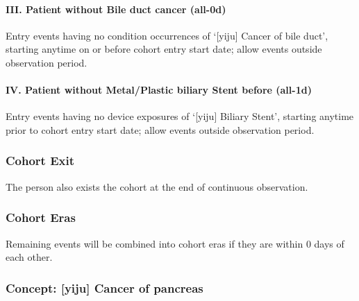 \documentclass[
  12pt,
]{article}
\begin{document}
\paragraph*{III. Patient without Bile duct cancer (all-0d)}\label{iii.-patient-without-bile-duct-cancer-all-0d}

Entry events having no condition occurrences of `{[}yiju{]} Cancer of bile duct', starting anytime on or before cohort entry start date; allow events outside observation period.

\paragraph*{IV. Patient without Metal/Plastic biliary Stent before (all-1d)}\label{iv.-patient-without-metalplastic-biliary-stent-before-all-1d}

Entry events having no device exposures of `{[}yiju{]} Biliary Stent', starting anytime prior to cohort entry start date; allow events outside observation period.

\subsubsection{Cohort Exit}\label{cohort-exit}

The person also exists the cohort at the end of continuous observation.

\subsubsection{Cohort Eras}\label{cohort-eras}

Remaining events will be combined into cohort eras if they are within 0 days of each other.

\subsubsection{Concept: {[}yiju{]} Cancer of pancreas}\label{concept-yiju-cancer-of-pancreas}

\begingroup\fontsize{8}{10}\selectfont
\end{document}
